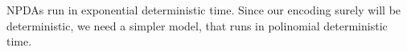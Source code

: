 NPDAs run in exponential deterministic time.
% 
% 
% 
% 
% 
% 
Since our encoding surely will be deterministic, we need a simpler
  model, that runs in polinomial deterministic time.
  
